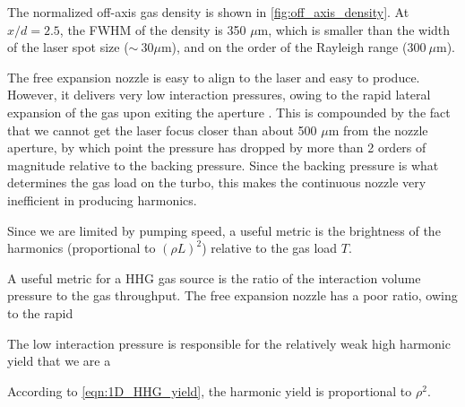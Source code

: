 The normalized off-axis gas density is shown in \cref{fig:off_axis_density}. At $x/d=2.5$, the FWHM of the density is 350 $\mu$m, which is smaller than the width of the laser spot size ($\sim \ 30 \mu$m), and on the order of the Rayleigh range ($300 \ \mu$m).

The free expansion nozzle is easy to align to the laser and easy to produce. However, it delivers very low interaction pressures, owing to the rapid lateral expansion of the gas upon exiting the aperture \cite{millerFreeJetSources1988}. This is compounded by the fact that we cannot get the laser focus closer than about 500 $\mu$m from the nozzle aperture, by which point the pressure has dropped by more than 2 orders of magnitude relative to the backing pressure. Since the backing pressure is what determines the gas load on the turbo, this makes the continuous nozzle very inefficient in producing harmonics.


Since we are limited by pumping speed, a useful metric is the brightness of the harmonics (proportional to $(\rho L)^2$) relative to the gas load $T$. 

A useful metric for a HHG gas source is the ratio of the interaction volume pressure to the gas throughput. The free expansion nozzle has a poor ratio, owing to the rapid 

The low interaction pressure is responsible for the relatively weak high harmonic yield that we are a

According to \cref{eqn:1D_HHG_yield}, the harmonic yield is proportional to $\rho^2$. 






